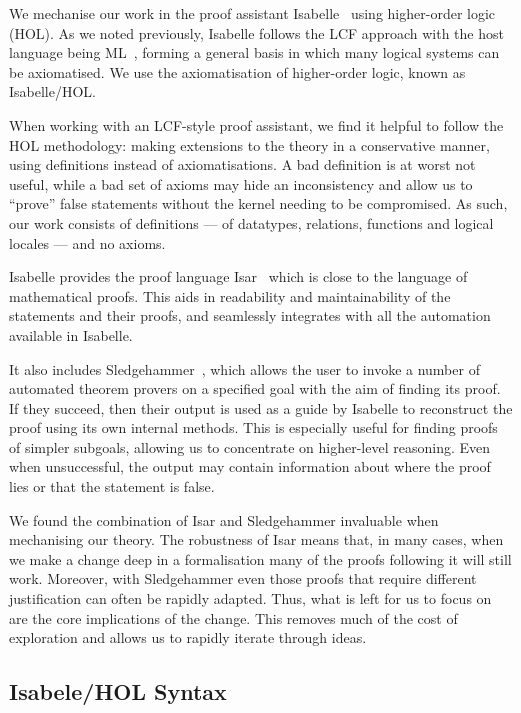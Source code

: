 \documentclass[class=smolathesis,crop=false]{standalone}
\begin{document}
We mechanise our work in the proof assistant Isabelle~\cite{paulson-1994} using higher-order logic (HOL).
As we noted previously, Isabelle follows the LCF approach with the host language being ML~\cite{milner_et_al-1990}, forming a general basis in which many logical systems can be axiomatised.
We use the axiomatisation of higher-order logic, known as Isabelle/HOL\@.

When working with an LCF-style proof assistant, we find it helpful to follow the HOL methodology: making extensions to the theory in a conservative manner, using definitions instead of axiomatisations.
A bad definition is at worst not useful, while a bad set of axioms may hide an inconsistency and allow us to ``prove'' false statements without the kernel needing to be compromised.
As such, our work consists of definitions --- of datatypes, relations, functions and logical locales --- and no axioms.

Isabelle provides the proof language Isar~\cite{wenzel-1999} which is close to the language of mathematical proofs.
This aids in readability and maintainability of the statements and their proofs, and seamlessly integrates with all the automation available in Isabelle.

It also includes Sledgehammer~\cite{blanchette_et_al-2011}, which allows the user to invoke a number of automated theorem provers on a specified goal with the aim of finding its proof.
If they succeed, then their output is used as a guide by Isabelle to reconstruct the proof using its own internal methods.
This is especially useful for finding proofs of simpler subgoals, allowing us to concentrate on higher-level reasoning.
Even when unsuccessful, the output may contain information about where the proof lies or that the statement is false.

We found the combination of Isar and Sledgehammer invaluable when mechanising our theory.
The robustness of Isar means that, in many cases, when we make a change deep in a formalisation many of the proofs following it will still work.
Moreover, with Sledgehammer even those proofs that require different justification can often be rapidly adapted.
Thus, what is left for us to focus on are the core implications of the change.
This removes much of the cost of exploration and allows us to rapidly iterate through ideas.

\subsection{Isabele/HOL Syntax}
\label{sec:intro/itp/syntax}
\cbend
\end{document}
